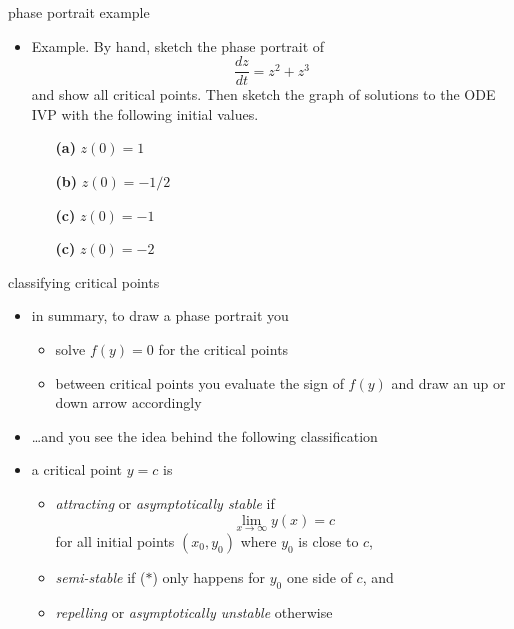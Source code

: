 \documentclass{beamer}
\begin{document}
\begin{frame}{phase portrait example}

\begin{itemize}
\small
\item \begin{minipage}[t]{0.4\textwidth}
Example.  By hand, sketch the phase portrait of
   $$\frac{dz}{dt} = z^2 + z^3$$
and show all critical points.  Then sketch the graph of solutions to the ODE IVP with the following initial values.
    \begin{itemize}
    \item[\color{black} \textbf{(a)}] $z(0)=1$
    \item[\color{black} \textbf{(b)}] $z(0)=-1/2$
    \item[\color{black} \textbf{(c)}] $z(0)=-1$
    \item[\color{black} \textbf{(c)}] $z(0)=-2$
    \end{itemize}
\end{minipage}
\end{itemize}
\end{frame}


\begin{frame}{classifying critical points}

\begin{itemize}
\item in summary, to draw a phase portrait you
    \begin{itemize}
    \item solve $f(y)=0$ for the critical points
    \item between critical points you evaluate the sign of $f(y)$ and draw an up or down arrow accordingly
    \end{itemize}
\item \dots and you see the idea behind the following classification

\medskip
\item a critical point $y=c$ is
    \begin{itemize}
    \item \emph{attracting} or \emph{asymptotically stable} if
\begin{equation}
        \lim_{x \to \infty} y(x) = c   \tag{$\ast$}
\end{equation}
    for all initial points $(x_0,y_0)$ where $y_0$ is close to $c$,
    \item \emph{semi-stable} if ($\ast$) only happens for $y_0$ one side of $c$, and
    \item \emph{repelling} or \emph{asymptotically unstable} otherwise
    \end{itemize}
\end{itemize}
\end{frame}
\end{document}
